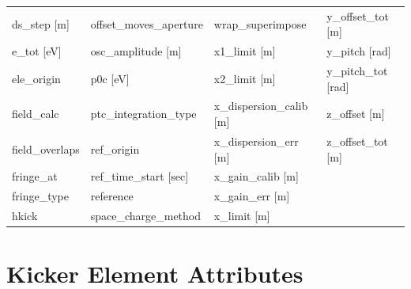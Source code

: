 \begin{tabular}{llll}
ds_step [m]                      & offset_moves_aperture            & wrap_superimpose                 & y_offset_tot [m]                 \\
e_tot [eV]                       & osc_amplitude [m]                & x1_limit [m]                     & y_pitch [rad]                    \\
ele_origin                       & p0c [eV]                         & x2_limit [m]                     & y_pitch_tot [rad]                \\
field_calc                       & ptc_integration_type             & x_dispersion_calib [m]           & z_offset [m]                     \\
field_overlaps                   & ref_origin                       & x_dispersion_err [m]             & z_offset_tot [m]                 \\
fringe_at                        & ref_time_start [sec]             & x_gain_calib [m]                 &                                  \\
fringe_type                      & reference                        & x_gain_err [m]                   &                                  \\
hkick                            & space_charge_method              & x_limit [m]                      &                                  \\
 \bottomrule
 \end{tabular}
 \vfill
 
 \section{Kicker Element Attributes}
 \label{s:list.kicker}
 
